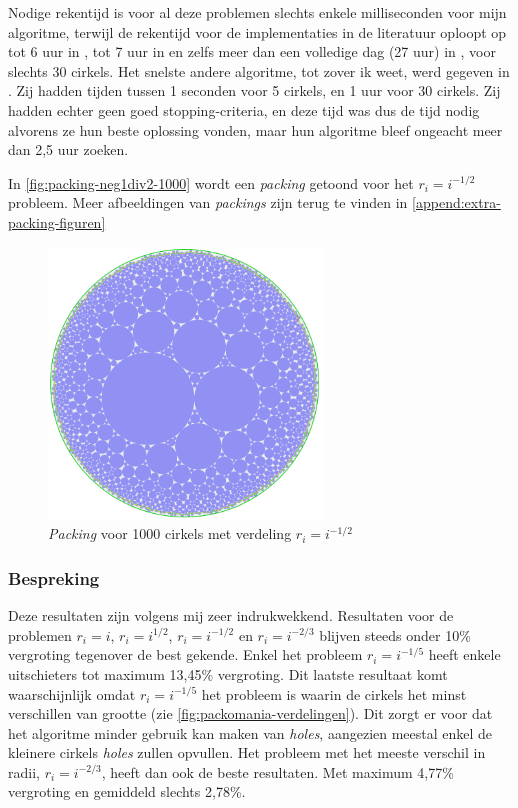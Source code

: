 \documentclass[12pt,a4paper,oneside]{book}
\begin{document}
Nodige rekentijd is voor al deze problemen slechts enkele milliseconden voor mijn algoritme, terwijl de rekentijd voor de implementaties in de literatuur oploopt op tot 6 uur in \cite{jors2011}, tot 7 uur in \cite{lopez2013packing} en zelfs meer dan een volledige dag (27 uur) in \cite{zeng2016iterated}, voor slechts 30 cirkels.
Het snelste andere algoritme, tot zover ik weet, werd gegeven in \cite{ye2013iterated}.
Zij hadden tijden tussen 1 seconden voor 5 cirkels, en 1 uur voor 30 cirkels.
Zij hadden echter geen goed stopping-criteria, en deze tijd was dus de tijd nodig alvorens ze hun beste oplossing vonden, maar hun algoritme bleef ongeacht meer dan 2,5 uur zoeken.

In \autoref{fig:packing-neg1div2-1000} wordt een \textit{packing} getoond voor het $r_i = i^{-1/2}$ probleem.
Meer afbeeldingen van \textit{packings} zijn terug te vinden in \autoref{append:extra-packing-figuren}

\begin{figure}
  \centering
  \includegraphics[width=0.65\textwidth]{packing-neg1div2-1000.png}
  \caption{\textit{Packing} voor 1000 cirkels met verdeling $r_i=i^{-1/2}$} \label{fig:packing-neg1div2-1000} 
\end{figure}

\subsubsection{Bespreking}

Deze resultaten zijn volgens mij zeer indrukwekkend.
Resultaten voor de problemen $r_i = i$, $r_i = i^{1/2}$, $r_i = i^{-1/2}$ en $r_i = i^{-2/3}$ blijven steeds onder 10\% vergroting tegenover de best gekende.
Enkel het probleem $r_i = i^{-1/5}$ heeft enkele uitschieters tot maximum 13,45\% vergroting.
Dit laatste resultaat komt waarschijnlijk omdat $r_i = i^{-1/5}$ het probleem is waarin de cirkels het minst verschillen van grootte (zie \autoref{fig:packomania-verdelingen}).
Dit zorgt er voor dat het algoritme minder gebruik kan maken van \textit{holes}, aangezien meestal enkel de kleinere cirkels \textit{holes} zullen opvullen.
Het probleem met het meeste verschil in radii, $r_i = i^{-2/3}$, heeft dan ook de beste resultaten.
Met maximum 4,77\% vergroting en gemiddeld slechts 2,78\%.
\end{document}
